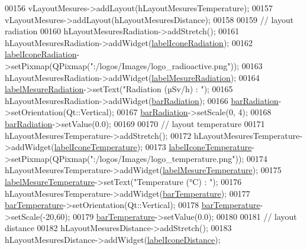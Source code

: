 \begin{DoxyCode}
00156     vLayoutMesures->addLayout(hLayoutMesuresTemperature);
00157     vLayoutMesures->addLayout(hLayoutMesuresDistance);
00158 
00159     \textcolor{comment}{// layout radiation}
00160     hLayoutMesuresRadiation->addStretch();
00161     hLayoutMesuresRadiation->addWidget(\hyperlink{class_i_h_m_rov_a29246e2035e7b3915a59614eb4802548}{labelIconeRadiation});
00162     \hyperlink{class_i_h_m_rov_a29246e2035e7b3915a59614eb4802548}{labelIconeRadiation}->setPixmap(QPixmap(\textcolor{stringliteral}{":/logos/Images/logo\_radioactive.png"}));
00163     hLayoutMesuresRadiation->addWidget(\hyperlink{class_i_h_m_rov_aaa9588a64c4af2f9fb08c62519a05c5a}{labelMesureRadiation});
00164     \hyperlink{class_i_h_m_rov_aaa9588a64c4af2f9fb08c62519a05c5a}{labelMesureRadiation}->setText(\textcolor{stringliteral}{"Radiation (µSv/h) : "});
00165     hLayoutMesuresRadiation->addWidget(\hyperlink{class_i_h_m_rov_a06f0850e46f735c3418360280f6c8336}{barRadiation});
00166     \hyperlink{class_i_h_m_rov_a06f0850e46f735c3418360280f6c8336}{barRadiation}->setOrientation(Qt::Vertical);
00167     \hyperlink{class_i_h_m_rov_a06f0850e46f735c3418360280f6c8336}{barRadiation}->setScale(0, 4);
00168     \hyperlink{class_i_h_m_rov_a06f0850e46f735c3418360280f6c8336}{barRadiation}->setValue(0.0);
00169 
00170     \textcolor{comment}{// layout temperature}
00171     hLayoutMesuresTemperature->addStretch();
00172     hLayoutMesuresTemperature->addWidget(\hyperlink{class_i_h_m_rov_a0404f03611d3942e7459ee431f05224c}{labelIconeTemperature});
00173     \hyperlink{class_i_h_m_rov_a0404f03611d3942e7459ee431f05224c}{labelIconeTemperature}->setPixmap(QPixmap(\textcolor{stringliteral}{":/logos/Images/logo\_temperature.png"}));
00174     hLayoutMesuresTemperature->addWidget(\hyperlink{class_i_h_m_rov_ade64349f20dac7adccee4d4fbc04e6e8}{labelMesureTemperature});
00175     \hyperlink{class_i_h_m_rov_ade64349f20dac7adccee4d4fbc04e6e8}{labelMesureTemperature}->setText(\textcolor{stringliteral}{"Temperature (°C) : "});
00176     hLayoutMesuresTemperature->addWidget(\hyperlink{class_i_h_m_rov_aa89397963e5889e2f911bed5112772cb}{barTemperature});
00177     \hyperlink{class_i_h_m_rov_aa89397963e5889e2f911bed5112772cb}{barTemperature}->setOrientation(Qt::Vertical);
00178     \hyperlink{class_i_h_m_rov_aa89397963e5889e2f911bed5112772cb}{barTemperature}->setScale(-20,60);
00179     \hyperlink{class_i_h_m_rov_aa89397963e5889e2f911bed5112772cb}{barTemperature}->setValue(0.0);
00180 
00181     \textcolor{comment}{// layout distance}
00182     hLayoutMesuresDistance->addStretch();
00183     hLayoutMesuresDistance->addWidget(\hyperlink{class_i_h_m_rov_ae8e7eef50b55104e1490191e3bdcb8d9}{labelIconeDistance});

\end{DoxyCode}
